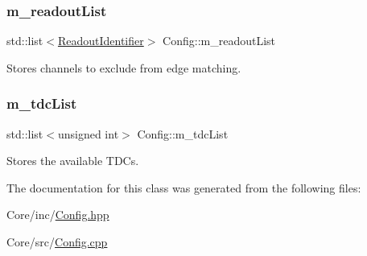 \subsubsection{\texorpdfstring{m\+\_\+readout\+List}{m\_readoutList}}
{\footnotesize\ttfamily std\+::list$<$\hyperlink{class_readout_identifier}{Readout\+Identifier}$>$ Config\+::m\+\_\+readout\+List\hspace{0.3cm}{\ttfamily [private]}}



Stores channels to exclude from edge matching. 

\mbox{\label{class_config_ac7295451d604cec09ed31ca74411c68c}} 
\subsubsection{\texorpdfstring{m\+\_\+tdc\+List}{m\_tdcList}}
{\footnotesize\ttfamily std\+::list$<$unsigned int$>$ Config\+::m\+\_\+tdc\+List\hspace{0.3cm}{\ttfamily [private]}}



Stores the available T\+D\+Cs. 



The documentation for this class was generated from the following files\+:\begin{DoxyCompactItemize}
\item 
Core/inc/\hyperlink{_config_8hpp}{Config.\+hpp}\item 
Core/src/\hyperlink{_config_8cpp}{Config.\+cpp}\end{DoxyCompactItemize}
